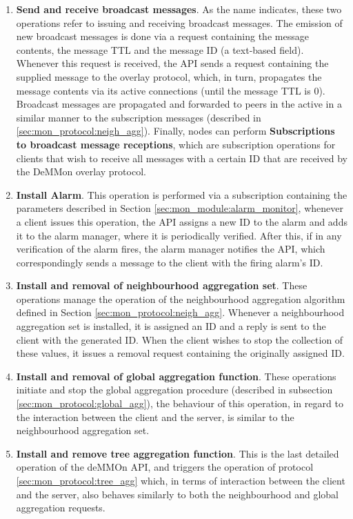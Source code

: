 \begin{enumerate}
    \item \textbf{Send and receive broadcast messages}. As the name indicates, these two operations refer to issuing and receiving broadcast messages. The emission of new broadcast messages is done via a request containing the message contents, the message TTL and the message ID (a text-based field). Whenever this request is received, the API sends a request containing the supplied message to the overlay protocol, which, in turn, propagates the message contents via its active connections (until the message TTL is 0). Broadcast messages are propagated and forwarded to peers in the active in a similar manner to the subscription messages (described in \ref{sec:mon_protocol:neigh_agg}). Finally, nodes can perform \textbf{Subscriptions to broadcast message receptions}, which are subscription operations for clients that wish to receive all messages with a certain ID that are received by the DeMMon overlay protocol. 
    
    \item \textbf{Install Alarm}. This operation is performed via a subscription containing the parameters described in Section \ref{sec:mon_module:alarm_monitor}, whenever a client issues this operation, the API assigns a new ID to the alarm and adds it to the alarm manager, where it is periodically verified. After this, if in any verification of the alarm fires, the alarm manager notifies the API, which correspondingly sends a message to the client with the firing alarm's ID.

    \item \textbf{Install and removal of neighbourhood aggregation set}. These operations manage the operation of the neighbourhood aggregation algorithm defined in Section \ref{sec:mon_protocol:neigh_agg}. Whenever a neighbourhood aggregation set is installed, it is assigned an ID and a reply is sent to the client with the generated ID. When the client wishes to stop the collection of these values, it issues a removal request containing the originally assigned ID.

    \item \textbf{Install and removal of global aggregation function}. These operations initiate and stop the global aggregation procedure (described in subsection \ref{sec:mon_protocol:global_agg}), the behaviour of this operation, in regard to the interaction between the client and the server, is similar to the neighbourhood aggregation set. 
    
    \item \textbf{Install and remove tree aggregation function}. This is the last detailed operation of the deMMOn API, and triggers the operation of protocol \ref{sec:mon_protocol:tree_agg} which, in terms of interaction between the client and the server, also behaves similarly to both the neighbourhood and global aggregation requests.
    
\end{enumerate}

